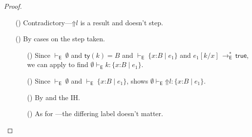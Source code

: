 \documentclass[9pt]{extarticle}
\newcommand{\ottnt}[1]{\mathit{#1}}
\newcommand{\ottsym}[1]{#1}
\begin{document}
\begin{lemma}
\begin{proof}
{\begin{itemize}
\begin{itemize}
        We can type the active check using our assumptions, where
        $ \ottnt{e_{{\mathrm{2}}}}  [  \ottnt{k} / \mathit{x}  ]  \,  \longrightarrow ^{*}_{  \mathsf{E}  }  \,  \ottnt{e_{{\mathrm{2}}}}  [  \ottnt{k} / \mathit{x}  ] $ by reflexivity. By substitution
        (and , to find $ \emptyset   \vdash _{  \mathsf{E}  }  \ottnt{k}  :   \{ \mathit{x} \mathord{:} \ottnt{B} \mathrel{\mid}  \mathsf{true}  \}  $), we
        find $ \emptyset   \vdash _{  \mathsf{E}  }   \ottnt{e_{{\mathrm{2}}}}  [  \ottnt{k} / \mathit{x}  ]   :   \{ \mathit{x} \mathord{:}  \mathsf{Bool}  \mathrel{\mid}  \mathsf{true}  \}  $. We can now apply
        , and can then apply an outer .
      \item[\E{StackInner}] By  and the IH. If $\ottnt{s}  \ottsym{=}   \mathord{\checkmark} $, we
        need to extend the evaluation derivation by one step.
      \item[\E{StackRaise}] We have $ \mathord{  \vdash _{  \mathsf{E}  } }~  \{ \mathit{x} \mathord{:} \ottnt{B} \mathrel{\mid} \ottnt{e} \}  $ and $ \mathord{  \vdash _{  \mathsf{E}  } }~ \Gamma $
        already, so by .
      \end{itemize}
    \item[(\T{Blame})] Contradictory---$ \mathord{\Uparrow}  \ottnt{l} $ is a result and
      doesn't step.
    \item[(\T{Check})]  By cases on the step taken.
\begin{itemize}
      \item[(\E{CheckOK})] Since $ \mathord{  \vdash _{  \mathsf{E}  } }~ \emptyset $ and $ \mathsf{ty} ( \ottnt{k} )   \ottsym{=}  \ottnt{B}$
        and $ \mathord{  \vdash _{  \mathsf{E}  } }~  \{ \mathit{x} \mathord{:} \ottnt{B} \mathrel{\mid} \ottnt{e_{{\mathrm{1}}}} \}  $ and $ \ottnt{e_{{\mathrm{1}}}}  [  \ottnt{k} / \mathit{x}  ]  \,  \longrightarrow ^{*}_{  \mathsf{E}  }  \,  \mathsf{true} $, we can
        apply  to find $ \emptyset   \vdash _{  \mathsf{E}  }  \ottnt{k}  :   \{ \mathit{x} \mathord{:} \ottnt{B} \mathrel{\mid} \ottnt{e_{{\mathrm{1}}}} \}  $.
      \item[(\E{CheckFail})] Since $ \mathord{  \vdash _{  \mathsf{E}  } }~ \emptyset $ and $ \mathord{  \vdash _{  \mathsf{E}  } }~  \{ \mathit{x} \mathord{:} \ottnt{B} \mathrel{\mid} \ottnt{e_{{\mathrm{1}}}} \}  $,  shows $ \emptyset   \vdash _{  \mathsf{E}  }   \mathord{\Uparrow}  \ottnt{l}   :   \{ \mathit{x} \mathord{:} \ottnt{B} \mathrel{\mid} \ottnt{e_{{\mathrm{1}}}} \}  $.
      \item[(\E{CheckInner})] By  and the IH.
      \item[(\E{CheckRaise})] As for ---the differing
        label doesn't matter.
      \end{itemize}
    \end{itemize}
    \fi}
  \end{proof}
\end{lemma}
\end{document}
